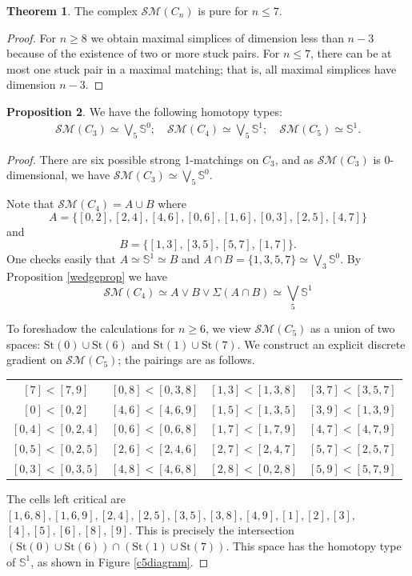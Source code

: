 \documentclass{amsart}
\theoremstyle{definition}
\newtheorem{theorem}{Theorem}[section]
\newtheorem{proposition}[theorem]{Proposition}
\newcommand{\zs}{{\mathbb S}}
\newcommand{\sm}{{\mathcal{SM}}}
\begin{document}
\begin{theorem} The complex $\mathcal{SM}(C_n)$ is pure for $n\le 7$.
\end{theorem}

\begin{proof}
    For $n\ge 8$ we obtain maximal simplices of dimension less than $n-3$ because of the existence of two or more stuck pairs. For $n\le 7$, there can be at most one stuck pair in a maximal matching; that is, all maximal simplices have dimension $n-3$.
\end{proof}

\begin{proposition}
We have the following homotopy types:
\begin{gather*}
      \sm(C_3)\simeq\bigvee_5 \zs^0;\quad \sm(C_4)\simeq\bigvee_5 \zs^1;\quad \sm(C_5)\simeq \zs^1.
\end{gather*}
\end{proposition}

\begin{proof}
     There are six possible strong 1-matchings on $C_3$, and as $\sm(C_3)$ is $0$-dimensional, we have $\sm(C_3)\simeq\bigvee_5\zs^0$.

    Note that $\sm(C_4)=A\cup B$ where $$A=\{[0,2],[2,4],[4,6],[0,6],[1,6],[0,3],[2,5],[4,7]\}$$ and $$B=\{[1,3],[3,5],[5,7],[1,7]\}.$$ One checks easily that $A\simeq\zs^1\simeq B$ and $A\cap B=\{1,3,5,7\}\simeq\bigvee_3\zs^0$. By Proposition \ref{wedgeprop} we have $$\sm(C_4)\simeq A\vee B\vee\Sigma(A\cap B)\simeq\bigvee_5\zs^1$$

    To foreshadow the calculations for $n\ge 6$, we view $\sm(C_5)$ as a union of two spaces: $\text{St}(0)\cup\text{St}(6)$ and $\text{St}(1)\cup\text{St}(7)$. We construct an explicit discrete gradient on $\sm(C_5)$; the pairings are as follows.
    
\begin{center}
\setlength{\tabcolsep}{10pt} %
\begin{tabular}{ c c c c }
 $[7]<[7,9]$ & $[0,8]<[0,3,8]$ & $[1,3]<[1,3,8]$ & $[3,7]<[3,5,7]$ \\ 
 $[0]<[0,2]$ & $[4,6]<[4,6,9]$ & $[1,5]<[1,3,5]$ & $[3,9]<[1,3,9]$ \\  
 $[0,4]<[0,2,4]$ & $[0,6]<[0,6,8]$ & $[1,7]<[1,7,9]$ & $[4,7]<[4,7,9]$ \\
 $[0,5]<[0,2,5]$ & $[2,6]<[2,4,6]$ & $[2,7]<[2,4,7]$ & $[5,7]<[2,5,7]$ \\
 $[0,3]<[0,3,5]$ & $[4,8]<[4,6,8]$ & $[2,8]<[0,2,8]$ & $[5,9]<[5,7,9]$
\end{tabular}
\end{center}

\noindent The cells left critical are $[1,6,8],[1,6,9],[2,4],[2,5],[3,5],[3,8],[4,9],[1],[2],[3],$\\$[4],[5],[6],[8],[9]$. This is precisely the intersection $(\text{St}(0)\cup\text{St}(6))\cap (\text{St}(1)\cup\text{St}(7))$. This space has the  homotopy type of $\zs^1$, as shown in Figure \ref{c5diagram}. 
\end{proof}
\end{document}
